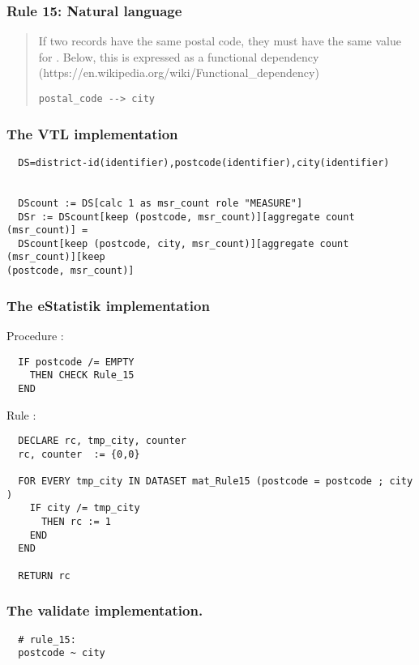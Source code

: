 \newpage

\subsubsection*{  Rule 15: Natural language}
\begin{quote}


If two records have the same postal code, they must have the same value for . Below, this is expressed
as a functional dependency (https://en.wikipedia.org/wiki/Functional\_dependency)

\begin{verbatim}
postal_code --> city
\end{verbatim}



\end{quote}
\subsubsection*{The VTL implementation}
\begin{verbatim}
  DS=district-id(identifier),postcode(identifier),city(identifier)


  DScount := DS[calc 1 as msr_count role "MEASURE"]
  DSr := DScount[keep (postcode, msr_count)][aggregate count (msr_count)] =
  DScount[keep (postcode, city, msr_count)][aggregate count (msr_count)][keep
(postcode, msr_count)]
\end{verbatim}
\subsubsection*{The eStatistik implementation}
\noindent
Procedure :
\begin{verbatim}
  IF postcode /= EMPTY
    THEN CHECK Rule_15
  END
\end{verbatim}
\noindent
Rule :
\begin{verbatim}
  DECLARE rc, tmp_city, counter
  rc, counter  := {0,0}

  FOR EVERY tmp_city IN DATASET mat_Rule15 (postcode = postcode ; city )
    IF city /= tmp_city
      THEN rc := 1
    END
  END
  
  RETURN rc
\end{verbatim}

\subsubsection*{The validate implementation.}
\begin{verbatim}
  # rule_15:
  postcode ~ city
\end{verbatim}


